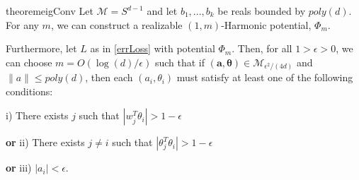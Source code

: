 \documentclass{article}
\newcommand{\Authornote}[2]{{\sf\color{red}{[#1: #2]}}}
\newcommand{\Authornote}[2]{}
\newcommand{\Snote}{\Authornote{S}}
\begin{document}
\begin{restatable}{theorem}{eigConv}
\label{eigConv}
Let $\mathcal{M} = S^{d-1}$ and let $b_1,...,b_k$ be reals bounded by $poly(d)$. For any $m$, we can construct a realizable $(1,m)$-Harmonic potential, $\Phi_m$. \Snote{almost harmonic?}

Furthermore, let $L$ as in \eqref{errLoss} with potential $\Phi_m$. Then, for all $ 1 > \epsilon > 0$, we can choose $m = O(\log(d)/\epsilon)$ such that if $(\boldsymbol{a,\theta}) \in \mathcal{M}_{\epsilon^2/(4d)}$ and $\|a\| \leq poly(d)$, then each $(a_i, \theta_i)$ must satisfy at least one of the following conditions:


i) There exists $j$ such that $|w_j^T\theta_i| > 1- \epsilon$ 

{\bf or} ii) There exists $j\neq i$ such that $|\theta_j^T\theta_i| > 1- \epsilon$ 

{\bf or} iii) $|a_i| < \epsilon.$
\end{restatable}
%
\end{document}

